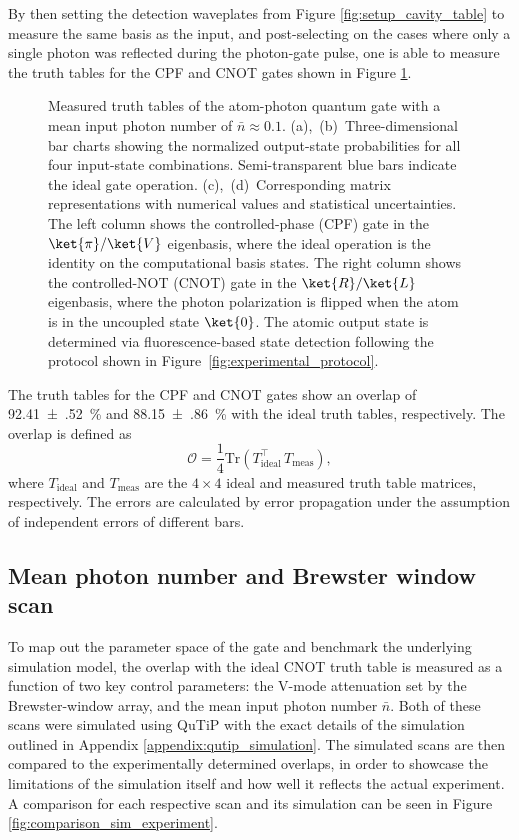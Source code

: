 By then setting the detection waveplates from Figure \ref{fig:setup_cavity_table} to measure the same basis as the input, and post-selecting on the cases where only a single photon was reflected during the photon-gate pulse, one is able to measure the truth tables for the CPF and CNOT gates shown in Figure \ref{fig:gate_truth_tables}.

\begin{figure}[htbp]
	\centering
	
	\caption{Measured truth tables of the atom-photon quantum gate with a mean input photon number of $\bar{n} \approx 0.1$.
		(a),~(b)~Three-dimensional bar charts showing the normalized output-state probabilities for all four input-state combinations.
		Semi-transparent blue bars indicate the ideal gate operation.
		(c),~(d)~Corresponding matrix representations with numerical values and statistical uncertainties.
		The left column shows the controlled-phase (CPF) gate in the $\ket{\pi}/\ket{V}$ eigenbasis, where the ideal operation is the identity on the computational basis states.
		The right column shows the controlled-NOT (CNOT) gate in the $\ket{R}/\ket{L}$ eigenbasis, where the photon polarization is flipped when the atom is in the uncoupled state $\ket{0}$.
		The atomic output state is determined via fluorescence-based state detection following the protocol shown in Figure~\ref{fig:experimental_protocol}.}
	\label{fig:gate_truth_tables}
\end{figure}

The truth tables for the CPF and CNOT gates show an overlap of \SI{92.41(52)}{\percent} and \SI{88.15(86)}{\percent} with the ideal truth tables, respectively. The overlap is defined as
\begin{equation}
	\mathcal{O} = \frac{1}{4} \mathrm{Tr}\!\left(T_{\mathrm{ideal}}^{\top} \, T_{\mathrm{meas}}\right),
\end{equation}
where $T_{\mathrm{ideal}}$ and $T_{\mathrm{meas}}$ are the $4\times4$ ideal and measured truth table matrices, respectively. The errors are calculated by error propagation under the assumption of independent errors of different bars.

\subsection{Mean photon number and Brewster window scan} \label{sec:photon_number_and_bw_scan}

To map out the parameter space of the gate and benchmark the underlying simulation model, the overlap with the ideal CNOT truth table is measured as a function of two key control parameters: the V-mode attenuation set by the Brewster-window array, and the mean input photon number $\bar{n}$. Both of these scans were simulated using QuTiP \cite{qutip5} with the exact details of the simulation outlined in Appendix \ref{appendix:qutip_simulation}. The simulated scans are then compared to the experimentally determined overlaps, in order to showcase the limitations of the simulation itself and how well it reflects the actual experiment. A comparison for each respective scan and its simulation can be seen in Figure \ref{fig:comparison_sim_experiment}.

